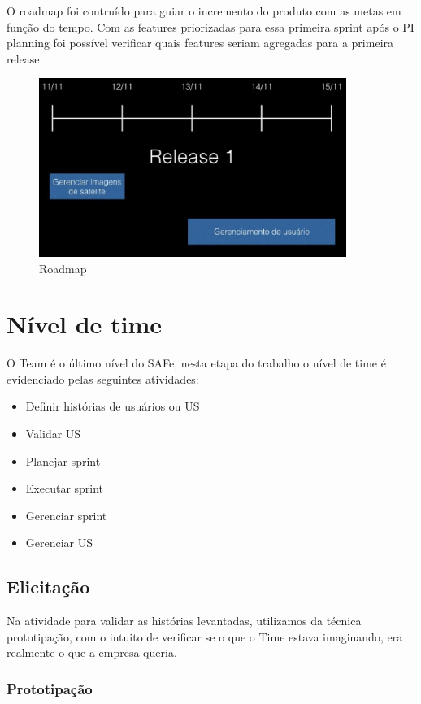   O roadmap foi contruído para guiar o incremento do produto com as metas em função do tempo.
  Com as features priorizadas para essa primeira sprint após o PI planning foi possível
  verificar quais features seriam agregadas para a primeira release.

  \begin{figure}[!h]
    \centering
    \includegraphics[width=10cm, keepaspectratio=true]{figuras/gerencia/roadmap.eps}
    \caption{Roadmap}
  \end{figure}

\section{Nível de time}

  O Team é o último nível do SAFe, nesta etapa do trabalho o nível de time é evidenciado pelas seguintes atividades:

  \begin{itemize}
    \item Definir histórias de usuários ou US
    \item Validar US
    \item Planejar sprint
    \item Executar sprint
    \item Gerenciar sprint
    \item Gerenciar US
  \end{itemize}

\subsection{Elicitação}
  Na atividade para validar as histórias levantadas, utilizamos da técnica prototipação, com o intuito de verificar se o que o Time estava imaginando, era realmente o que a empresa queria.
\subsubsection{Prototipação}

